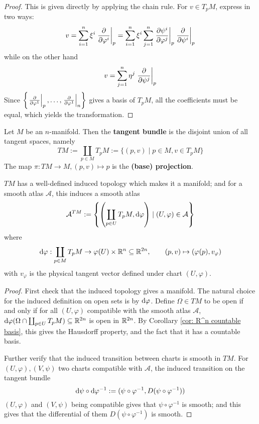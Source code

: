 \documentclass{article}
\begin{document}
\begin{proof}
    This is given directly by applying the chain rule. For $v \in T_pM$, express in two ways:
    \[
        v = \sum_{i = 1}^{n} \xi^i \left.\frac{\partial }{\partial \varphi^i}\right|_{p} = \sum_{i = 1}^{n} \xi^i \sum_{j = 1}^{n} \left.\frac{\partial \psi^i}{\partial \varphi^j}\right|_{p} \left.\frac{\partial }{\partial \psi^i}\right|_{p}
    \]
    while on the other hand
    \[
        v = \sum_{j = 1}^{n} \eta^j \left.\frac{\partial }{\partial \psi^j}\right|_{p}
    \]
    Since $\left\{ \left.\frac{\partial }{\partial \varphi^1}\right|_{p}, \dots, \left.\frac{\partial }{\partial \varphi^1}\right|_{n} \right\}$ gives a basis of $T_pM$, all the coefficients must be equal, which yields the transformation.
\end{proof}

\begin{definition}
    Let $M$ be an $n$-manifold. Then the \textbf{tangent bundle} is the disjoint union of all tangent spaces, namely
    \[
        TM := \coprod_{p \in M} T_p M := \{(p, v) \mid p \in M, v \in T_p M\}
    \]
    The map $\pi: TM \to M, (p, v) \mapsto p$ is the \textbf{(base) projection}.
\end{definition}

\begin{proposition}
    $TM$ has a well-defined induced topology which makes it a manifold; and for a smooth atlas $\mathcal{A}$, this induces a smooth atlas
    \[
        \mathcal{A}^{TM} := \left\{ \left( \coprod_{p \in U} T_pM, \mathrm{d} \varphi \right) \mid (U, \varphi) \in \mathcal{A} \right\}
    \]
    where
    \[
        \mathrm{d} \varphi : \coprod_{p \in M} T_p M \to \varphi(U) \times \mathbb{R}^n \subseteq \mathbb{R}^{2n}, \qquad (p, v) \mapsto (\varphi(p), v_{\varphi}) 
    \]
    with $v_{\varphi}$ is the physical tangent vector defined under chart $(U, \varphi)$.
\end{proposition}

\begin{proof}
    First check that the induced topology gives a manifold. The natural choice for the induced definition on open sets is by $\mathrm{d}\varphi$. Define $\Omega \in TM$ to be open if and only if for all $(U, \varphi)$ compatible with the smooth atlas $\mathcal{A}$, $\mathrm{d}\varphi(\Omega \cap \coprod_{p \in U} T_pM) \subseteq \mathbb{R}^{2n}$ is open in $\mathbb{R}^{2n}$. By Corollary \ref{cor: R^n countable basis}, this gives the Hausdorff property, and the fact that it has a countable basis.

    Further verify that the induced transition between charts is smooth in $TM$. For $(U, \varphi), (V, \psi)$ two charts compatible with $\mathcal{A}$, the induced transition on the tangent bundle
    \[
        \mathrm{d}\psi \circ \mathrm{d} \varphi^{-1} := (\psi \circ \varphi^{-1}, D(\psi \circ \varphi^{-1}))
    \]
    $(U, \varphi)$ and $(V, \psi)$ being compatible gives that $\psi \circ \varphi^{-1}$ is smooth; and this gives that the differential of them $D(\psi \circ \varphi^{-1})$ is smooth.
\end{proof}
\end{document}

